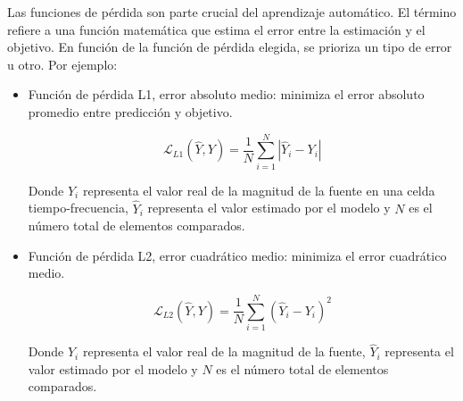 Las funciones de pérdida son parte crucial del aprendizaje automático. El término refiere a una función matemática que estima el error entre la estimación y el objetivo. En función de la función de pérdida elegida, se prioriza un tipo de error u otro. Por ejemplo:

\begin{itemize}
    \item Función de pérdida L1, error absoluto medio: minimiza el error absoluto promedio entre predicción y objetivo.
\begin{center}
    \[
\mathcal{L}_{L1}(\hat{Y}, Y) =
\frac{1}{N}
\sum_{i=1}^{N}
\left| \hat{Y}_i - Y_i \right|
\]
\end{center}

Donde \(Y_i\) representa el valor real de la magnitud de la fuente en una celda tiempo-frecuencia, \(\hat{Y}_i\) representa el valor estimado por el modelo y \(N\) es el número total de elementos comparados.

    \item Función de pérdida L2, error cuadrático medio: minimiza el error cuadrático medio.
\begin{center}
    \[
\mathcal{L}_{L2}(\hat{Y}, Y) =
\frac{1}{N}
\sum_{i=1}^{N}
\left( \hat{Y}_i - Y_i \right)^2
\]
\end{center}

Donde \(Y_i\) representa el valor real de la magnitud de la fuente, \(\hat{Y}_i\) representa el valor estimado por el modelo y \(N\) es el número total de elementos comparados.


\end{itemize}